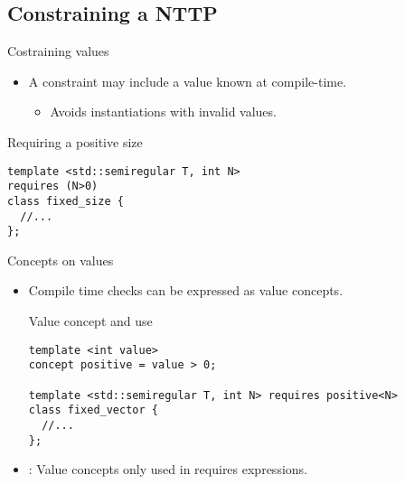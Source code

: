 \subsection{Constraining a NTTP}

\begin{frame}[t,fragile]{Costraining values}
\begin{itemize}
  \item A constraint may include a value known at compile-time.
    \begin{itemize}
      \item Avoids instantiations with invalid values.
    \end{itemize}
\end{itemize}

\begin{block}{Requiring a positive size}
\begin{lstlisting}
template <std::semiregular T, int N>
requires (N>0)
class fixed_size {
  //...
};
\end{lstlisting}
\end{block}

\end{frame}

\begin{frame}[t,fragile]{Concepts on values}
\begin{itemize}
  \item Compile time checks can be expressed as value concepts.

\begin{block}{Value concept and use}
\begin{lstlisting}
template <int value>
concept positive = value > 0;

template <std::semiregular T, int N> requires positive<N>
class fixed_vector {
  //...
};
\end{lstlisting}
\end{block}

  \item {}: Value concepts only used in requires expressions.

\end{itemize}
\end{frame}
